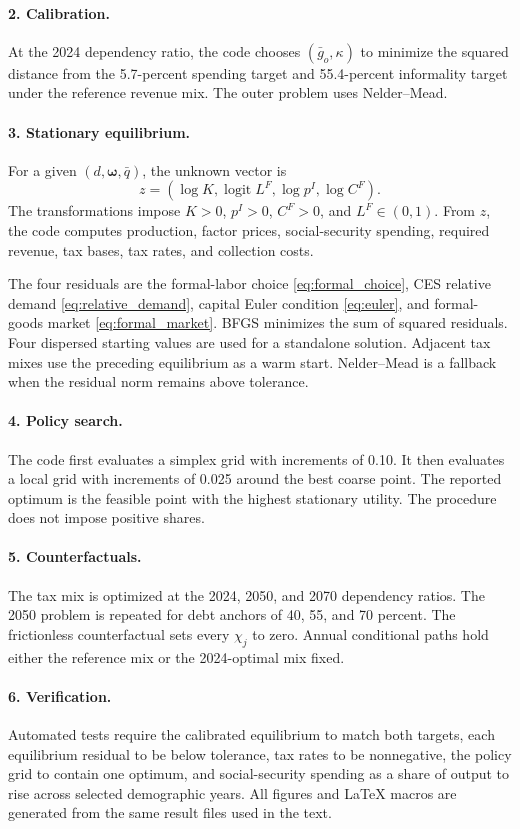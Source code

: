 \documentclass[12pt]{article}
\begin{document}
\paragraph{2. Calibration.}
At the 2024 dependency ratio, the code chooses
$(\bar g_o,\kappa)$ to minimize the squared distance from the 5.7-percent
spending target and 55.4-percent informality target under the reference
revenue mix. The outer problem uses Nelder--Mead.

\paragraph{3. Stationary equilibrium.}
For a given $(d,\boldsymbol{\omega},\bar q)$, the unknown vector is
\[
 z=\left(\log K,\operatorname{logit}L^F,\log p^I,\log C^F\right).
\]
The transformations impose $K>0$, $p^I>0$, $C^F>0$, and
$L^F\in(0,1)$. From $z$, the code computes production, factor prices,
social-security spending, required revenue, tax bases, tax rates, and
collection costs.

The four residuals are the formal-labor choice
\eqref{eq:formal_choice}, CES relative demand \eqref{eq:relative_demand},
capital Euler condition \eqref{eq:euler}, and formal-goods market
\eqref{eq:formal_market}. BFGS minimizes the sum of squared residuals.
Four dispersed starting values are used for a standalone solution. Adjacent
tax mixes use the preceding equilibrium as a warm start. Nelder--Mead is a
fallback when the residual norm remains above tolerance.

\paragraph{4. Policy search.}
The code first evaluates a simplex grid with increments of 0.10. It then
evaluates a local grid with increments of 0.025 around the best coarse point.
The reported optimum is the feasible point with the highest stationary
utility. The procedure does not impose positive shares.

\paragraph{5. Counterfactuals.}
The tax mix is optimized at the 2024, 2050, and 2070 dependency ratios. The
2050 problem is repeated for debt anchors of 40, 55, and 70 percent. The
frictionless counterfactual sets every $\chi_j$ to zero. Annual conditional
paths hold either the reference mix or the 2024-optimal mix fixed.

\paragraph{6. Verification.}
Automated tests require the calibrated equilibrium to match both targets,
each equilibrium residual to be below tolerance, tax rates to be
nonnegative, the policy grid to contain one optimum, and social-security
spending as a share of output to rise across selected demographic years.
All figures and LaTeX macros are generated from the same result files used in
the text.



\end{document}
